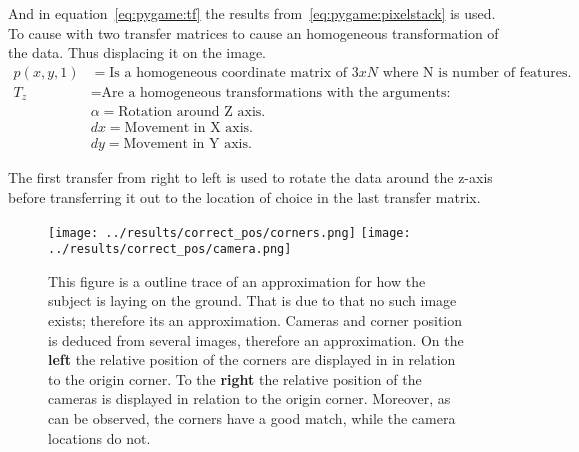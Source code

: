 And in equation~\ref{eq:pygame:tf} the results from~\ref{eq:pygame:pixelstack} is used.
To cause with two transfer matrices to cause an homogeneous transformation of the data.
Thus displacing it on the image.
\begin{align*}
    p(x,y,1) &=  \text{Is a homogeneous coordinate matrix of $3xN$ where N is number of features.}\\
    T_{z}    &=  \text{Are a homogeneous transformations with the arguments:}\\
             & \alpha  = \text{Rotation around Z axis.}\\
             & dx =      \text{Movement in X axis.}\\
             & dy =      \text{Movement in Y axis.}
\end{align*}

The first transfer from right to left is used to rotate the data around the z-axis before transferring it out to the location of choice in the last transfer matrix.



\begin{figure}
\begin{center}
    \texttt{[image: ../results/correct\_pos/corners.png]}
    \hspace{1cm}
    \texttt{[image: ../results/correct\_pos/camera.png]}
\end{center}
\caption[Approx locations of markers and cameras]{This figure is a outline trace of an approximation for how the subject is laying on the ground.
    That is due to that no such image exists; therefore its an approximation.
Cameras and corner position is deduced from several images, therefore an approximation.
    On the \textbf{left} the relative position of the \aruco{ } corners are displayed in in relation to the origin corner.
    To the \textbf{right} the relative position of the cameras is displayed in relation to the \aruco{ } origin corner.
Moreover, as can be observed, the corners have a good match, while the camera locations do not.}
\label{fig:correct_pose}
\end{figure}


